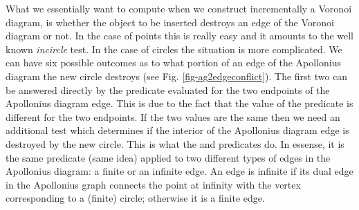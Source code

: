 What we essentially want to compute when we construct incrementally a
Voronoi diagram, is whether the object to be inserted destroys an edge
of the Voronoi diagram or not. In the case of points this is really
easy and it amounts to the well known {\em incircle} test. In the case
of circles the situation is more complicated. We can have six possible
outcomes as to what portion of an edge of the Apollonius diagram the
new circle destroys (see Fig. \ref{fig-ag2edgeconflict}). The first
two can be answered directly by the  predicate
evaluated for the two endpoints of the Apollonius diagram edge. This
is due to the fact that the value of the 
predicate is different for the two endpoints. If the two values are
the same then we need an additional test which determines if the interior
of the Apollonius diagram edge is destroyed by the new circle. This is
what the  and
 predicates do. In essense, it
is the same predicate (same idea) applied to two different types of
edges in the Apollonius diagram: a finite or an infinite edge. An edge
is infinite if its dual edge in the Apollonius graph connects the
point at infinity with the vertex corresponding to a (finite) circle; 
otherwise it is a finite edge.

